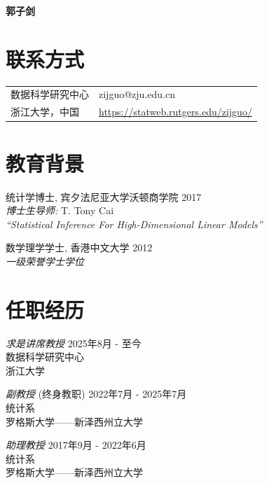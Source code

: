 \documentclass[margin, line]{res}
\begin{document}
	\textbf{\Large{\qquad \qquad \qquad \quad \quad 郭子剑}}
	\newline

	\begin{resume}
		\section{\sc 联系方式}
		\vspace{.05in}

        \begin{tabular}{@{}p{2.5in}p{4in}}
			数据科学研究中心    & zijguo@zju.edu.cn                         \\
			浙江大学，中国 & \url{https://statweb.rutgers.edu/zijguo/} \\
		\end{tabular}

		\section{\sc 教育背景}
		{统计学博士}, 宾夕法尼亚大学沃顿商学院 \hfill 2017
		\\ {\it 博士生导师:} T. Tony Cai\\
		{\it ``Statistical Inference For High-Dimensional Linear Models''}
		
		\vspace*{-3mm}

		{数学理学学士}, 香港中文大学 \hfill 2012\\
		{\it 一级荣誉学士学位}


		\vspace*{-0mm}

        \section{\sc 任职经历}
		{\it 求是讲席教授} \hfill 2025年8月 - 至今 \\ {数据科学研究中心}\\
		浙江大学

		{\it 副教授} (终身教职) \hfill 2022年7月 - 2025年7月 \\
		{统计系}\\ 罗格斯大学——新泽西州立大学

		{\it 助理教授} \hfill 2017年9月 - 2022年6月 \\
		{统计系}\\ 罗格斯大学——新泽西州立大学

		\vspace*{-0mm}


\end{resume}
\end{document}
